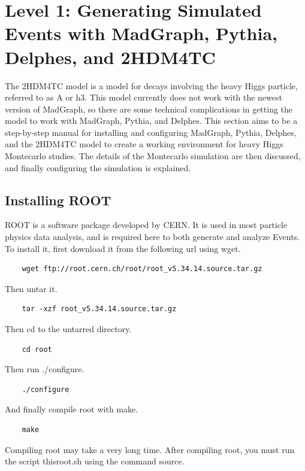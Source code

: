 \documentclass{article}
\begin{document}
\section{Level 1: Generating Simulated Events with MadGraph, Pythia, Delphes, and 2HDM4TC}

The 2HDM4TC model is a model for decays involving the heavy Higgs particle, referred to as A or h3.
This model currently does not work with the newest version of MadGraph, so there are some technical
complications in getting the model to work with MadGraph, Pythia, and Delphes. This section aims to
be a step-by-step manual for installing and configuring MadGraph, Pythia, Delphes, and the 2HDM4TC
model to create a working environment for heavy Higgs Montecarlo studies. The details of the Montecarlo
simulation are then discussed, and finally configuring the simulation is explained.

\subsection{Installing ROOT}

ROOT is a software package developed by CERN. It is used in most particle physics data analysis,
and is required here to both generate and analyze Events. To install it, first download it from
the following url using wget.

\begin{verbatim}
	wget ftp://root.cern.ch/root/root_v5.34.14.source.tar.gz
\end{verbatim}

Then untar it.

\begin{verbatim}
	tar -xzf root_v5.34.14.source.tar.gz
\end{verbatim}

Then cd to the untarred directory.

\begin{verbatim}
	cd root
\end{verbatim}

Then run ./configure.

\begin{verbatim}
	./configure
\end{verbatim}

And finally compile root with make.

\begin{verbatim}
	make
\end{verbatim}

Compiling root may take a very long time. After compiling root, you must run the
script thisroot.sh using the command source.
\end{document}
